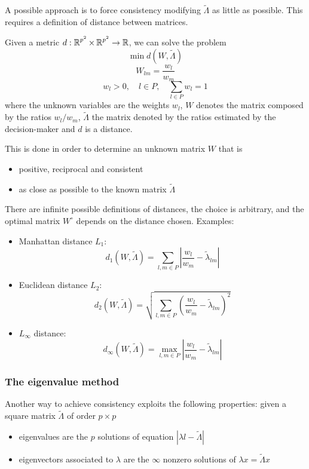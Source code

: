 A possible approach is to force consistency modifying $\tilde \Lambda$ as little as possible. This requires a definition of distance between matrices.

Given a metric $d: \operatorname{\mathbb{R}}^{p^2} \times \operatorname{\mathbb{R}}^{p^2} \rightarrow \operatorname{\mathbb{R}}$, we can solve the problem
$$ \min d\left(W, \tilde \Lambda \right) $$
$$ W_{lm} = \frac{w_l}{w_m} $$
$$ w_l > 0, \quad l \in P, \quad \sum_{l \in P} w_l = 1$$
where the unknown variables are the weights $w_l$, $W$ denotes the matrix composed by the ratios $w_l/w_m$, $\tilde \Lambda$ the matrix denoted by the ratios estimated by the decision-maker and $d$ is a distance.

This is done in order to determine an unknown matrix $W$ that is 
\begin{itemize}
	\item positive, reciprocal and consistent
	
	\item as close as possible to the known matrix $\tilde \Lambda$
\end{itemize}

There are infinite possible definitions of distances, the choice is arbitrary, and the optimal matrix $W^\circ$ depends on the distance chosen. Examples: 
\begin{itemize}
	\item Manhattan distance $L_1$:
	$$ d_1 \left(W, \tilde \Lambda\right) = \sum_{l,m \in P} \left|\frac{w_l}{w_m} - \tilde \lambda_{lm} \right|$$
	
	\item Euclidean distance $L_2$:
	$$ d_2 \left(W, \tilde \Lambda\right) = \sqrt{\sum_{l,m \in P} \left(\frac{w_l}{w_m} - \tilde \lambda_{lm} \right)^2} $$
	
	\item $L_{\infty}$ distance:
	$$ d_{\infty} \left(W, \tilde \Lambda\right) = \max_{l,m \in P} \left|\frac{w_l}{w_m} - \tilde \lambda_{lm} \right| $$
\end{itemize}

\subsubsection{The eigenvalue method}

Another way to achieve consistency exploits the following properties: given a square matrix $\tilde \Lambda$ of order $p \times p$
\begin{itemize}
	\item eigenvalues are the $p$ solutions of equation $|\lambda l - \tilde \Lambda|$
	
	\item eigenvectors associated to $\lambda$ are the $\infty$ nonzero solutions of $\lambda x = \tilde \Lambda x$
\end{itemize}

